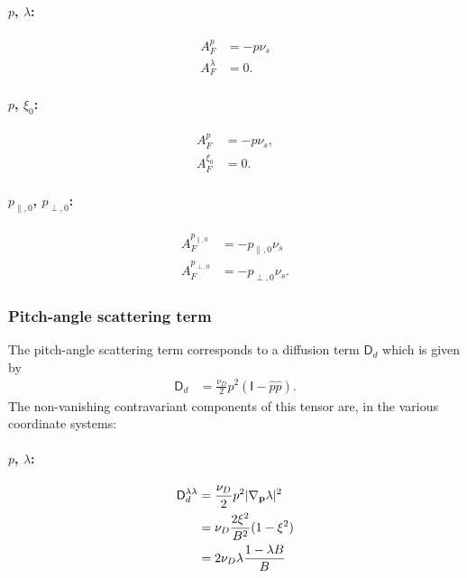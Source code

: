 \documentclass[11pt,a4paper]{article}
\renewcommand{\b}[1]{\ensuremath{ {\bf #1 } }}
\begin{document}
\paragraph{$p$, $\lambda$:}
\begin{align}
A_F^p &= -p\nu_s \nonumber \\
A_F^\lambda &=  0. 
\end{align}

\paragraph{$p$, $\xi_0$:}
\begin{align}
A_F^p &= -p\nu_s, \nonumber \\
A_F^{\xi_0} &=  0.
\end{align}

\paragraph{$p_{\parallel,0}$, $p_{\perp,0}$:}
\begin{align}
A_F^{p_{\parallel,0}} &= -p_{\parallel,0}\nu_s \nonumber \\
A_F^{p_{\perp,0}} &= -p_{\perp,0}\nu_s.
\end{align}


\subsubsection*{Pitch-angle scattering term}
The pitch-angle scattering term corresponds to a diffusion term $\mathsf{D}_d$ which is given by
\begin{align}
\mathsf{D}_d &=  \frac{\nu_D}{2} p^2\left(\mathsf{I}  - \hat{p}\hat{p}\right).
\end{align} 
The non-vanishing contravariant components of this tensor are, in the various coordinate systems:


\paragraph{$p$, $\lambda$:}
\begin{align}
\mathsf{D}_d^{\lambda \lambda} &=  \frac{\nu_D}{2}p^2 |\nabla_\b{p}\lambda|^2 \nonumber \\
&= \nu_D \frac{2\xi^2}{B^2}(1-\xi^2) \nonumber \\
&= 2\nu_D \lambda \frac{1-\lambda B}{B}
\end{align}
\end{document}
